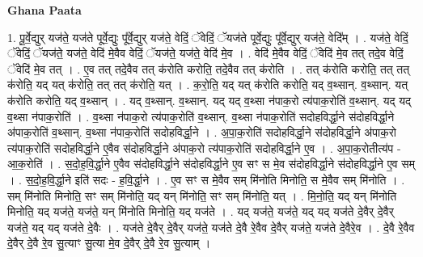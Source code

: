\documentclass[17pt]{extarticle}
\begin{document}
\textbf{Ghana Paata } \newline

1. पू॒र्वे॒द्युर् यज॑ते॒ यज॑ते पूर्वे॒द्युः पू᳚र्वे॒द्युर् यज॑ते॒ वेदिं॒ ॅवेदिं॒ ॅयज॑ते पूर्वे॒द्युः पू᳚र्वे॒द्युर् यज॑ते॒ वेदि᳚म् । . यज॑ते॒ वेदिं॒ ॅवेदिं॒ ॅयज॑ते॒ यज॑ते॒ वेदि॑ मे॒वैव वेदिं॒ ॅयज॑ते॒ यज॑ते॒ वेदि॑ मे॒व । . वेदि॑ मे॒वैव वेदिं॒ ॅवेदि॑ मे॒व तत् तदे॒व वेदिं॒ ॅवेदि॑ मे॒व तत् । . ए॒व तत् तदे॒वैव तत् क॑रोति करोति॒ तदे॒वैव तत् क॑रोति । . तत् क॑रोति करोति॒ तत् तत् क॑रोति॒ यद् यत् क॑रोति॒ तत् तत् क॑रोति॒ यत् । . क॒रो॒ति॒ यद् यत् क॑रोति करोति॒ यद् व॒थ्सान्. व॒थ्सान्. यत् क॑रोति करोति॒ यद् व॒थ्सान् । . यद् व॒थ्सान्. व॒थ्सान्. यद् यद् व॒थ्सा न॑पाक॒रो त्य॑पाक॒रोति॑ व॒थ्सान्. यद् यद् व॒थ्सा न॑पाक॒रोति॑ । . व॒थ्सा न॑पाक॒रो त्य॑पाक॒रोति॑ व॒थ्सान्. व॒थ्सा न॑पाक॒रोति॑ सदोहविर्द्धा॒ने स॑दोहविर्द्धा॒ने अ॑पाक॒रोति॑ व॒थ्सान्. व॒थ्सा न॑पाक॒रोति॑ सदोहविर्द्धा॒ने । . अ॒पा॒क॒रोति॑ सदोहविर्द्धा॒ने स॑दोहविर्द्धा॒ने अ॑पाक॒रो त्य॑पाक॒रोति॑ सदोहविर्द्धा॒ने ए॒वैव स॑दोहविर्द्धा॒ने अ॑पाक॒रो त्य॑पाक॒रोति॑ सदोहविर्द्धा॒ने ए॒व । . अ॒पा॒क॒रोतीत्य॑प - आ॒क॒रोति॑ । . स॒दो॒ह॒वि॒र्द्धा॒ने ए॒वैव स॑दोहविर्द्धा॒ने स॑दोहविर्द्धा॒ने ए॒व सꣳ स मे॒व स॑दोहविर्द्धा॒ने स॑दोहविर्द्धा॒ने ए॒व सम् । . स॒दो॒ह॒वि॒र्द्धा॒ने इति॑ सदः - ह॒वि॒र्द्धा॒ने । . ए॒व सꣳ स मे॒वैव सम् मि॑नोति मिनोति॒ स मे॒वैव सम् मि॑नोति । . सम् मि॑नोति मिनोति॒ सꣳ सम् मि॑नोति॒ यद् यन् मि॑नोति॒ सꣳ सम् मि॑नोति॒ यत् । . मि॒नो॒ति॒ यद् यन् मि॑नोति मिनोति॒ यद् यज॑ते॒ यज॑ते॒ यन् मि॑नोति मिनोति॒ यद् यज॑ते । . यद् यज॑ते॒ यज॑ते॒ यद् यद् यज॑ते दे॒वैर् दे॒वैर् यज॑ते॒ यद् यद् यज॑ते दे॒वैः । . यज॑ते दे॒वैर् दे॒वैर् यज॑ते॒ यज॑ते दे॒वै रे॒वैव दे॒वैर् यज॑ते॒ यज॑ते दे॒वैरे॒व । . दे॒वै रे॒वैव दे॒वैर् दे॒वै रे॒व सु॒त्याꣳ सु॒त्या मे॒व दे॒वैर् दे॒वै रे॒व सु॒त्याम् । \newline
\end{document}
